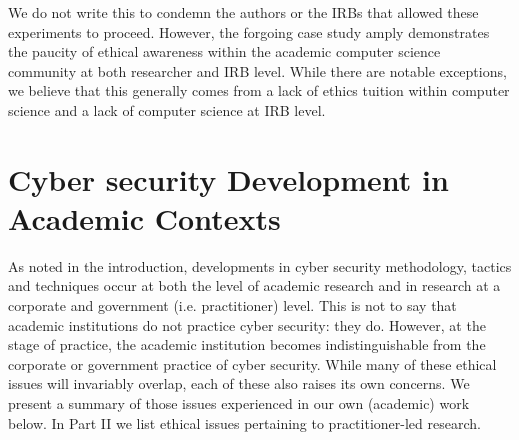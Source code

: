\documentclass{svjour3}                     %
\begin{document}
We do not write this to condemn the authors or the IRBs that allowed these experiments to proceed. However, the forgoing case study amply demonstrates the paucity of ethical awareness within the academic computer science community at both researcher and IRB level. While there are notable exceptions, we believe that this generally comes from a lack of ethics tuition within computer science and a lack of computer science at IRB level.

\section{Cyber security Development in Academic Contexts}
\label{sec:academicdev}
As noted in the introduction, developments in cyber security methodology, tactics and techniques occur at both the level of academic research and in research at a corporate and government (i.e. practitioner) level.  This is not to say that academic institutions do not practice cyber security: they do. However, at the stage of practice, the academic institution becomes indistinguishable from the corporate or government practice of cyber security. While many of these ethical issues will invariably overlap, each of these also raises its own concerns. We present a summary of those issues experienced in our own (academic) work below. In Part II we list ethical issues pertaining to practitioner-led research.
\end{document}
